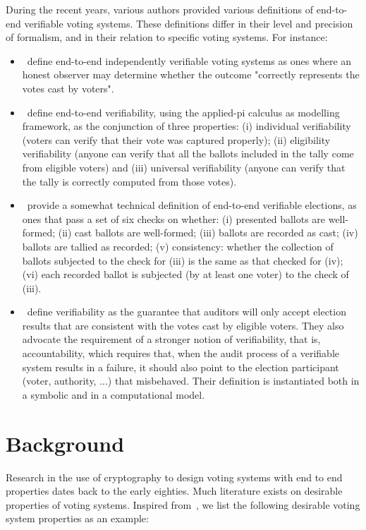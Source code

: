 During the recent years, various authors provided various definitions of
end-to-end verifiable voting systems. These definitions differ in their
level and precision of formalism, and in their relation to  specific voting
systems. For instance:
\begin{itemize}
  \item \cite{lowry2009}~define end-to-end independently verifiable voting
    systems as ones where an honest observer may determine whether the
    outcome "correctly represents the votes cast by voters".
  \item \cite{kremer2010}~define end-to-end verifiability, using the
    applied-pi calculus as modelling framework, as the conjunction of three
    properties: (i) individual verifiability (voters can verify that their
    vote was captured properly); (ii) eligibility verifiability (anyone can
    verify that all the ballots included in the tally come from eligible
    voters) and (iii) universal verifiability (anyone can verify that the
    tally is correctly computed from those votes).
  \item \cite{popoveniuc2010}~provide a somewhat technical definition of
    end-to-end verifiable elections, as ones that pass a set of six checks
    on whether: (i) presented ballots are well-formed; (ii) cast ballots are
    well-formed; (iii) ballots are recorded as cast; (iv) ballots are
    tallied as recorded; (v) consistency: whether the collection of ballots
    subjected to the check for (iii) is the same as that checked for (iv);
    (vi) each recorded ballot is subjected (by at least one voter) to the
    check of (iii).
  \item \cite{kusters2010}~define verifiability as the guarantee that
    auditors will only accept election results that are consistent with the
    votes cast by eligible voters. They also advocate the requirement of a
    stronger notion of verifiability, that is, accountability, which
    requires that, when the audit process of a verifiable system results in
    a failure, it should also point to the election participant (voter,
    authority, ...) that misbehaved.  Their definition is instantiated both
    in a symbolic and in a computational model.
\end{itemize}

\section{Background}

Research in the use of cryptography to design voting systems with end to end
properties dates back to the early eighties. Much literature exists on
desirable properties of voting systems. Inspired from~\cite{kremer2005}, we
list the following desirable voting system properties as an example:

